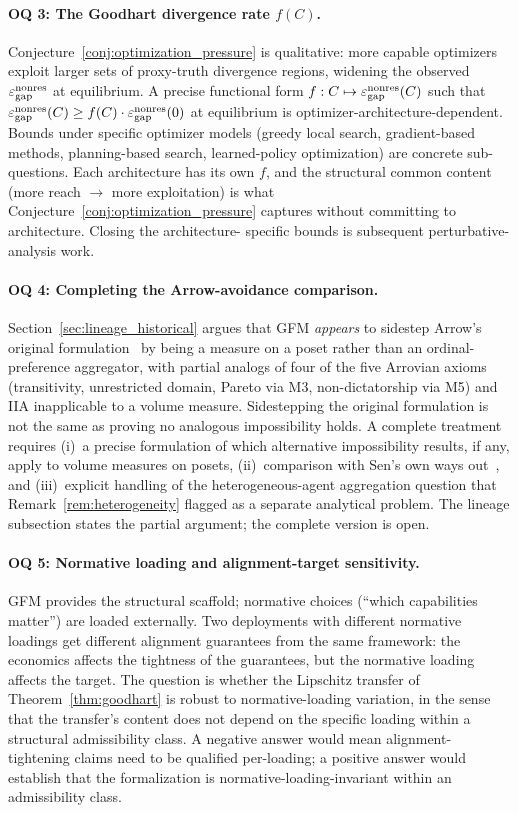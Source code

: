 \paragraph{OQ 3: The Goodhart divergence rate $f(C)$.}
\label{oq:goodhart_rate}
Conjecture~\ref{conj:optimization_pressure} is qualitative: more capable
optimizers exploit larger sets of proxy-truth divergence
regions, widening the observed $\varepsilon_{\mathrm{gap}}^{\mathrm{nonres}}$ at equilibrium.  A
precise functional form $f: C \mapsto \varepsilon_{\mathrm{gap}}^{\mathrm{nonres}}(C)$ such that
$\varepsilon_{\mathrm{gap}}^{\mathrm{nonres}}(C) \geq f(C) \cdot \varepsilon_{\mathrm{gap}}^{\mathrm{nonres}}(0)$ at equilibrium is
optimizer-architecture-dependent.  Bounds under specific
optimizer models (greedy local search, gradient-based methods,
planning-based search, learned-policy optimization) are
concrete sub-questions.  Each architecture has its own $f$, and
the structural common content (more reach $\to$ more
exploitation) is what Conjecture~\ref{conj:optimization_pressure} captures
without committing to architecture.  Closing the architecture-
specific bounds is subsequent perturbative-analysis work.

\paragraph{OQ 4: Completing the Arrow-avoidance comparison.}
\label{oq:arrow}
Section~\ref{sec:lineage_historical} argues that GFM
\emph{appears} to sidestep Arrow's original
formulation~\citep{arrow1951social} by being a measure on a
poset rather than an ordinal-preference aggregator, with
partial analogs of four of the five Arrovian axioms
(transitivity, unrestricted domain, Pareto via M3,
non-dictatorship via M5) and IIA inapplicable to a volume
measure.  Sidestepping the original formulation is not the same
as proving no analogous impossibility holds.  A complete
treatment requires (i)~a precise formulation of which
alternative impossibility results, if any, apply to volume
measures on posets, (ii)~comparison with Sen's own ways
out~\citep{sen1970collective}, and (iii)~explicit handling of
the heterogeneous-agent aggregation question that
Remark~\ref{rem:heterogeneity} flagged as a separate analytical
problem.  The lineage subsection states the partial argument;
the complete version is open.

\paragraph{OQ 5: Normative loading and alignment-target
sensitivity.}
\label{oq:normative}
GFM provides the structural scaffold; normative choices
(``which capabilities matter'') are loaded externally.  Two
deployments with different normative loadings get different
alignment guarantees from the same framework: the economics
affects the tightness of the guarantees, but the normative
loading affects the target.  The question is whether the
Lipschitz transfer of Theorem~\ref{thm:goodhart} is robust
to normative-loading variation, in the sense that the
transfer's content does not depend on the specific loading
within a structural admissibility class.  A negative answer
would mean alignment-tightening claims need to be qualified
per-loading; a positive answer would establish that the
formalization is normative-loading-invariant within an
admissibility class.

